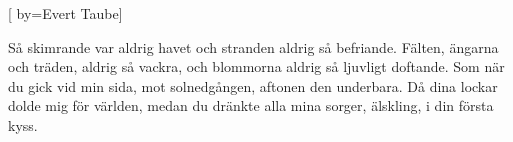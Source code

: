 


[ 	%
	by={Evert Taube}]		%
	
\beginverse*		%
Så skimrande var aldrig havet
och stranden aldrig så befriande. 
Fälten, ängarna och träden, aldrig så vackra,
och blommorna aldrig så ljuvligt doftande.
Som när du gick vid min sida,
mot solnedgången, aftonen den underbara. 
Då dina lockar dolde mig för världen, 
medan du dränkte alla mina sorger, 
älskling, 
i din första kyss.
\endverse			%
\endsong			%
